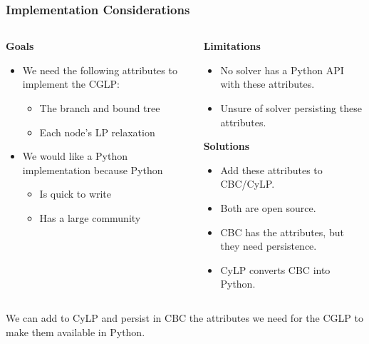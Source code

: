 \documentclass{beamer}
\begin{document}
	\begin{frame}[t]
		\frametitle{Implementation Considerations}
		\vspace{-.25cm}
		\begin{columns}[T]
			\begin{column}{0.5\textwidth}
				\large
				\textbf{Goals}
				\small
				\begin{itemize}
					\item We need the following attributes to implement the CGLP:
					\begin{itemize}
						\item The branch and bound tree
						\item Each node's LP relaxation
					\end{itemize}
					\item We would like a Python implementation because Python
					\begin{itemize}
						\item Is quick to write
						\item Has a large community
					\end{itemize}
				\end{itemize}
			\end{column}
			\begin{column}{0.5\textwidth}
				\large
				\textbf{Limitations}
				\small
				\begin{itemize}
					\item No solver has a Python API with these attributes.
					\item Unsure of solver persisting these attributes.
				\end{itemize}
				\large
				\textbf{Solutions}
				\small
				\begin{itemize}
					\item Add these attributes to CBC/CyLP.
					\item Both are open source.
					\item CBC has the attributes, but they need persistence.
					\item CyLP converts CBC into Python.
				\end{itemize}
			\end{column}
		\end{columns}
		\small
		\begin{block}{}
			We can add to CyLP and persist in CBC the attributes we need for the CGLP to make them available in Python.
		\end{block}
		\normalsize
	\end{frame}
\end{document}
